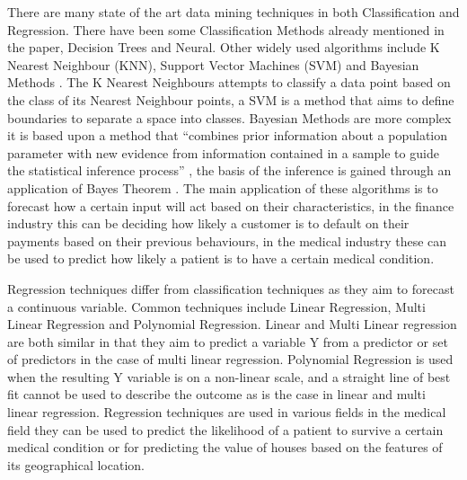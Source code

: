 \documentclass{imc-inf}
\begin{document}
	There are many state of the art data mining techniques in both Classification and Regression. There have been some Classification Methods already mentioned in the paper, Decision Trees and Neural. Other widely used algorithms include K Nearest Neighbour (KNN), Support Vector Machines (SVM) and Bayesian Methods \cite{SOTA}. The K Nearest Neighbours attempts to classify a data point based on the class of its Nearest Neighbour points, a SVM is a method that aims to define boundaries to separate a space into classes. Bayesian Methods are more complex it is based upon a method that “combines prior information about a population parameter with new evidence from information contained in a sample to guide the statistical inference process” \cite{website:Britannica}, the basis of the inference is gained through an application of Bayes Theorem \cite{website:Britannica}. The main application of these algorithms is to forecast how a certain input will act based on their characteristics, in the finance industry this can be deciding how likely a customer is to default on their payments based on their previous behaviours, in the medical industry these can be used to predict how likely a patient is to have a certain medical condition.
	
	Regression techniques differ from classification techniques as they aim to forecast a continuous variable. Common techniques include Linear Regression, Multi Linear Regression and Polynomial Regression. Linear and Multi Linear regression are both similar in that they aim to predict a variable Y from a predictor or set of predictors in the case of multi linear regression. Polynomial Regression is used when the resulting Y variable is on a non-linear scale, and a straight line of best fit cannot be used to describe the outcome as is the case in linear and multi linear regression. Regression techniques are used in various fields in the medical field they can be used to predict the likelihood of a patient to survive a certain medical condition \cite{SOTA} or for predicting the value of houses based on the features of its geographical location.
	
\end{document}
